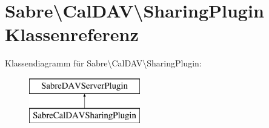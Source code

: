 \hypertarget{class_sabre_1_1_cal_d_a_v_1_1_sharing_plugin}{}\section{Sabre\textbackslash{}Cal\+D\+AV\textbackslash{}Sharing\+Plugin Klassenreferenz}
\label{class_sabre_1_1_cal_d_a_v_1_1_sharing_plugin}
Klassendiagramm für Sabre\textbackslash{}Cal\+D\+AV\textbackslash{}Sharing\+Plugin\+:\begin{figure}[H]
\begin{center}
\leavevmode
\includegraphics[height=2.000000cm]{class_sabre_1_1_cal_d_a_v_1_1_sharing_plugin}
\end{center}
\end{figure}
